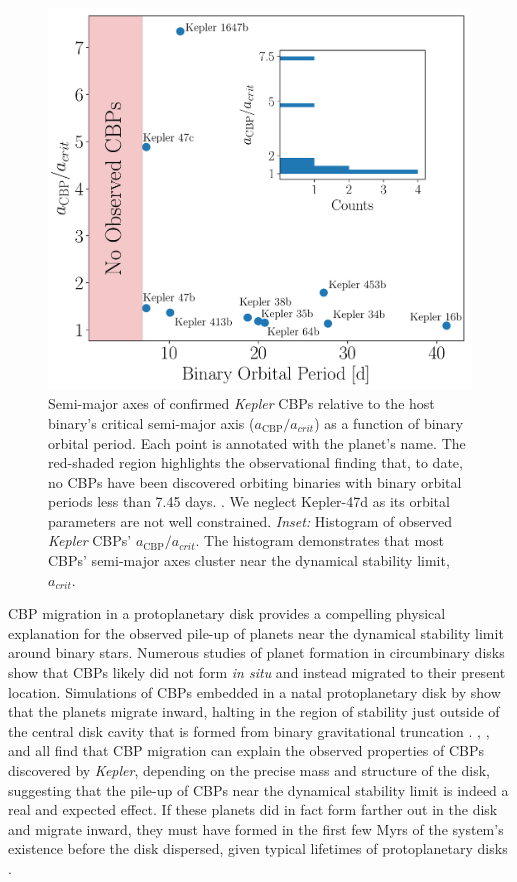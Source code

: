 \begin{figure}[]
	\includegraphics[width=\columnwidth]{observed_acrit.pdf}
    \caption{Semi-major axes of confirmed {\it Kepler} CBPs relative to the host binary's critical semi-major axis ($a_{\text{CBP}}/a_{crit}$) as a function of binary orbital period. Each point is annotated with the planet's name.  The red-shaded region highlights the observational finding that, to date, no CBPs have been discovered orbiting binaries with binary orbital periods less than 7.45 days. \citep{Welsh2014,Winn2015}.  We neglect Kepler-47d as its orbital parameters are not well constrained. {\it Inset:} Histogram of observed {\it Kepler} CBPs' $a_{\text{CBP}}/a_{crit}$.  The histogram demonstrates that most CBPs' semi-major axes cluster near the dynamical stability limit, $a_{crit}$.}
    \label{fig:observed_acrit}
\end{figure}

CBP migration in a protoplanetary disk provides a compelling physical explanation for the observed pile-up of planets near the dynamical stability limit around binary stars.  Numerous studies of planet formation in circumbinary disks show that CBPs likely did not form {\it in situ} \citep[e.g.][]{Paardekooper2012,Meschiari2012a,Meschiari2012b,Pelupessy2013} and instead migrated to their present location.  Simulations of CBPs embedded in a natal protoplanetary disk by \citet{PierensNelson2007} show that the planets migrate inward, halting in the region of stability just outside of the central disk cavity that is formed from binary gravitational truncation \citep{Arty1994}.  \citet{Dunhill2013}, \citet{Pierens2013}, and \citet{Kley2014} all find that CBP migration can explain the observed properties of CBPs discovered by {\it Kepler}, depending on the precise mass and structure of the disk, suggesting that the pile-up of CBPs near the dynamical stability limit is indeed a real and expected effect.  If these planets did in fact form farther out in the disk and migrate inward, they must have formed in the first few Myrs of the system's existence before the disk dispersed, given typical lifetimes of protoplanetary disks \citep[e.g.][]{Haisch2001}.

